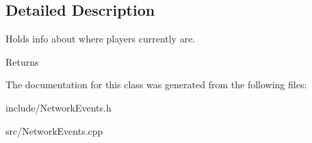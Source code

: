 \subsection{Detailed Description}
Holds info about where players currently are. 

\begin{DoxyReturn}{Returns}

\end{DoxyReturn}


The documentation for this class was generated from the following files\-:\begin{DoxyCompactItemize}
\item 
include/Network\-Events.\-h\item 
src/Network\-Events.\-cpp\end{DoxyCompactItemize}
